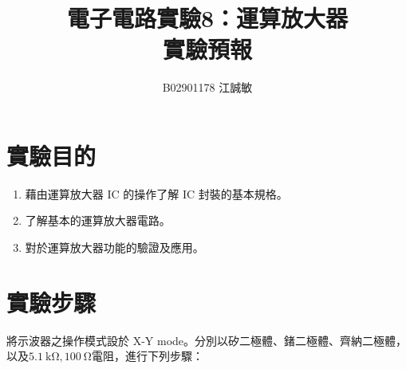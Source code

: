 \documentclass[12pt, a4paper]{article}
\title{ \bf {\huge 電子電路實驗8：運算放大器}\\ 實驗預報}
\author{B02901178 江誠敏}
\begin{document}
\maketitle

\section{實驗目的}
\begin{enumerate}[itemsep=0pt]
  \item 藉由運算放大器 IC 的操作了解 IC 封裝的基本規格。
  \item 了解基本的運算放大器電路。
  \item 對於運算放大器功能的驗證及應用。
\end{enumerate}


\section{實驗步驟}
將示波器之操作模式設於 X-Y mode。分別以矽二極體、鍺二極體、齊納二極體，以及$\SI{5.1}\kohm, \SI{100}\ohm$電阻，進行下列步驟：
\end{document}
